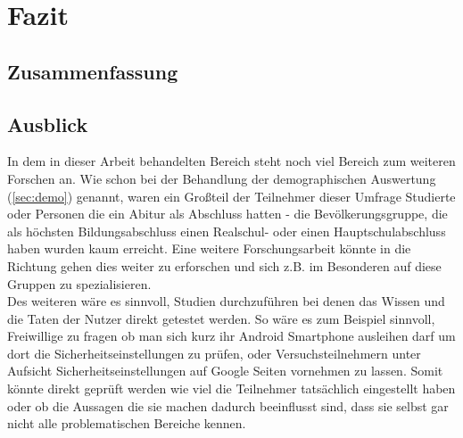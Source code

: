 %
% 

\chapter{Fazit}


\section{Zusammenfassung}

\section{Ausblick}
In dem in dieser Arbeit behandelten Bereich steht noch viel Bereich zum weiteren Forschen an. Wie schon bei der Behandlung der demographischen Auswertung (\ref{sec:demo}) genannt, waren ein Großteil der Teilnehmer dieser Umfrage Studierte oder Personen die ein Abitur als Abschluss hatten - die Bevölkerungsgruppe, die als höchsten Bildungsabschluss einen Realschul- oder einen Hauptschulabschluss haben wurden kaum erreicht. Eine weitere Forschungsarbeit könnte in die Richtung gehen dies weiter zu erforschen und sich z.B. im Besonderen auf diese Gruppen zu spezialisieren.\\
Des weiteren wäre es sinnvoll, Studien durchzuführen bei denen das Wissen und die Taten der Nutzer direkt getestet werden. So wäre es zum Beispiel sinnvoll, Freiwillige zu fragen ob man sich kurz ihr Android Smartphone ausleihen darf um dort die Sicherheitseinstellungen zu prüfen, oder Versuchsteilnehmern unter Aufsicht Sicherheitseinstellungen auf Google Seiten vornehmen zu lassen. Somit könnte direkt geprüft werden wie viel die Teilnehmer tatsächlich eingestellt haben oder ob die Aussagen die sie machen dadurch beeinflusst sind, dass sie selbst gar nicht alle problematischen Bereiche kennen.\\

